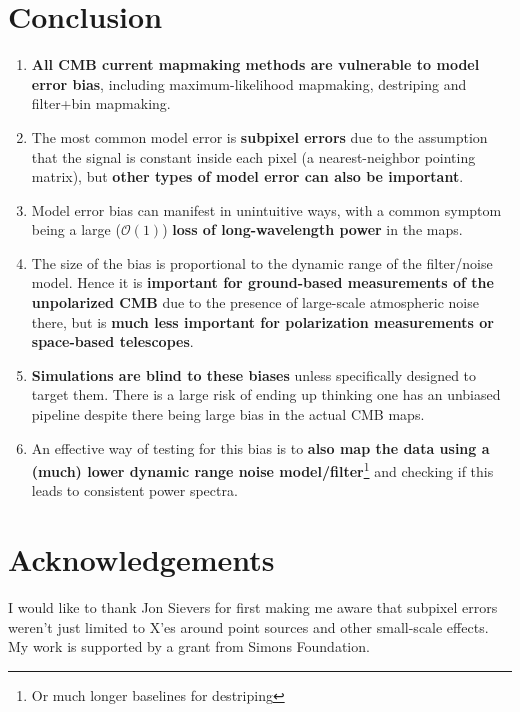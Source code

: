 \documentclass[twocolumn,apj]{aastex63}
\begin{document}
\section{Conclusion}

\begin{enumerate}
	\item \textbf{All CMB current mapmaking methods are vulnerable to model error bias},
		including maximum-likelihood mapmaking, destriping and filter+bin mapmaking.
	\item The most common model error is \textbf{subpixel errors} due to the assumption that
		the signal is constant inside each pixel (a nearest-neighbor pointing matrix),
		but \textbf{other types of model error can also be important}.
	\item Model error bias can manifest in unintuitive ways, with a common symptom
		being a large ($\mathcal{O}(1)$) \textbf{loss of long-wavelength power} in the maps.
	\item The size of the bias is proportional to the dynamic range of the filter/noise model.
		Hence it is \textbf{important for ground-based measurements of the unpolarized CMB}
		due to the presence of large-scale atmospheric noise there, but is \textbf{much less
		important for polarization measurements or space-based telescopes}.
	\item \textbf{Simulations are blind to these biases} unless specifically designed to
		target them. There is a large risk of ending up thinking one has an unbiased
		pipeline despite there being large bias in the actual CMB maps.
	\item An effective way of testing for this bias is to \textbf{also map the data using a
		(much) lower dynamic range noise model/filter}\footnote{Or much longer baselines for destriping}
		and checking if this leads to consistent power spectra.
\end{enumerate}

\section*{Acknowledgements}
I would like to thank Jon Sievers for first making me aware
that subpixel errors weren't just limited to X'es around point
sources and other small-scale effects.
My work is supported by a grant from Simons Foundation.



\end{document}
